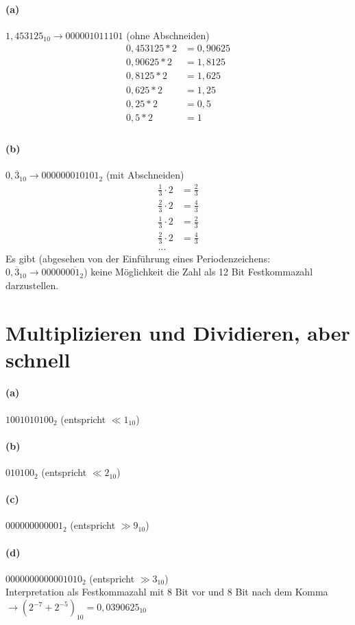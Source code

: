\documentclass[a4paper]{article}
\begin{document}
\paragraph{(a)}
$1,453125_{10}\rightarrow 000001011101$ (ohne Abschneiden)
\begin{align*}
	0,453125 * 2 &= 0,90625 \\
	0,90625 * 2 &= 1,8125 \\
	0,8125 * 2 &= 1,625 \\
	0,625 * 2 &= 1,25 \\
	0,25 * 2 &= 0,5 \\
	0,5 * 2 &= 1 \\
\end{align*}
\paragraph{(b)}
$0,\overline{3}_{10}\rightarrow 000000010101_{2}$ (mit Abschneiden)
\begin{align*}
	\frac{1}{3}\cdot 2 &= \frac{2}{3} \\
	\frac{2}{3}\cdot 2 &= \frac{4}{3} \\
	\frac{1}{3}\cdot 2 &= \frac{2}{3} \\
	\frac{2}{3}\cdot 2 &= \frac{4}{3} \\
	\text{\ldots}
\end{align*}
Es gibt (abgesehen von der Einführung eines Periodenzeichens: $0,\overline{3}_{10}\rightarrow 000000\overline{01}_{2}$) keine Möglichkeit die Zahl als 12 Bit Festkommazahl darzustellen.



\section{Multiplizieren und Dividieren, aber schnell}
\paragraph{(a)}
$1001010100_{2}$ (entspricht $\ll 1_{10}$)
\paragraph{(b)}
$010100_{2}$ (entspricht $\ll 2_{10}$)
\paragraph{(c)}
$000000000001_{2}$ (entspricht $\gg 9_{10}$)
\paragraph{(d)}
$0000000000001010_2$ (entspricht $\gg3_{10}$) \\
Interpretation als Festkommazahl mit 8 Bit vor und 8 Bit nach dem Komma $\rightarrow (2^{-7}+2^{-5})_{10} = 0,0390625_{10}$
\end{document}
